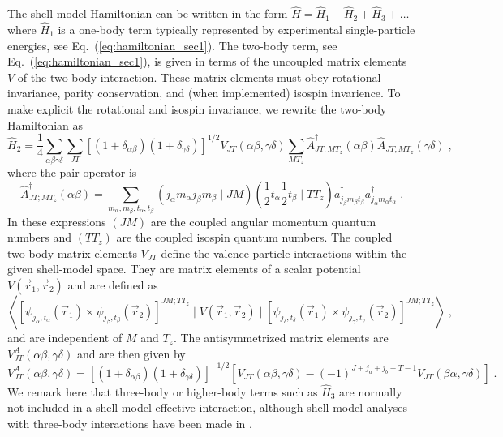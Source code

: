 \documentclass[rmp,aps,floatfix]{revtex4}
\begin{document}
The
shell-model Hamiltonian can be written in the form $\hat{H}=\hat{H}_1+
\hat{H}_2+\hat{H}_3+\dots$ where
$\hat{H}_1$
is a one-body term typically represented by experimental single-particle
energies, see Eq.~(\ref{eq:hamiltonian_sec1}).
The two-body term, see Eq.~(\ref{eq:hamiltonian_sec1}), 
is given in 
terms of the uncoupled matrix elements $V$ of the two-body interaction. 
These matrix elements must obey rotational invariance, parity conservation,
and (when implemented) isospin invarience. To make explicit the 
rotational and isospin invariance, we rewrite the two-body Hamiltonian 
as 
\begin{equation}
\hat{H}_2 = \frac{1}{4}\sum_{\alpha\beta\gamma\delta}\sum_{JT}
\left[\left(1+\delta_{\alpha\beta}\right)\left(1+\delta_{\gamma\delta}\right)\right]^{1/2}
V_{JT}(\alpha\beta,\gamma\delta)\sum_{MT_z}\hat{A}^\dagger_{JT;MT_z}(\alpha\beta)
\hat{A}_{JT;MT_z}(\gamma\delta) \;, 
\end{equation}
where the pair operator is 
\begin{equation}
\hat{A}^\dagger_{JT;MT_z}(\alpha\beta)=\sum_{m_{\alpha},m_{\beta},t_{\alpha},t_{\beta}}
\left(j_{\alpha} m_{\alpha} j_{\beta} m_{\beta} \mid JM\right)
\left(\frac{1}{2}t_{\alpha}\frac{1}{2} t_{\beta}\mid TT_z\right)
a^\dagger_{j_{\beta}m_{\beta}t_{\beta}}a^\dagger_{j_{\alpha}m_{\alpha}t_{\alpha}}\;.
\end{equation}
In these expressions $(JM)$ are the coupled angular momentum quantum
numbers and $(TT_z)$ are the coupled isospin quantum numbers. The coupled
two-body matrix elements $V_{JT}$ define the valence particle interactions
within the given shell-model space. They are matrix elements of a 
scalar potential $V(\vec{r}_1,\vec{r}_2)$ and are defined as 
\begin{equation}
\left\langle 
\left[\psi_{j_{\alpha},t_{\alpha}}
(\vec{r}_1)\times\psi_{j_{\beta},t_{\beta}}(\vec{r}_2)\right]^{JM;TT_z} 
\mid V(\vec{r}_1,\vec{r}_2) \mid  
\left[\psi_{j_{\delta},t_{\delta}}(\vec{r}_1)
\times\psi_{j_{\gamma},t_{\gamma}}(\vec{r}_2)\right]^{JM;TT_z}
\right\rangle \;,
\end{equation}
and are independent of $M$ and $T_z$. The antisymmetrized matrix elements
are $V^A_{JT}(\alpha\beta,\gamma\delta)$ and are then given by
\begin{equation}
V^{A}_{JT}(\alpha\beta,\gamma\delta)=
\left[\left(1+\delta_{\alpha\beta}\right)\left(1+\delta_{\gamma\delta}\right)\right]^{-1/2}
\left[V_{JT}(\alpha\beta,\gamma\delta)-(-1)^{J+j_a+j_b+T-1}V_{JT}
(\beta\alpha,\gamma\delta)\right]\;.
\end{equation}
We remark here that
three-body or higher-body terms such as $\hat{H}_3$ are normally
not included in a shell-model effective interaction, although shell-model
analyses with three-body interactions 
have been made in \cite{herbert89,eh2002}.
\end{document}
